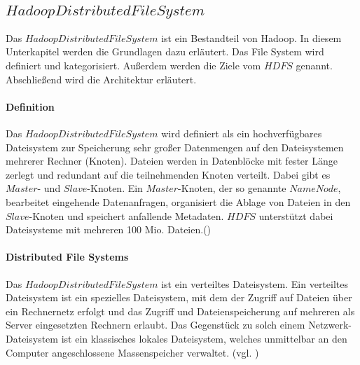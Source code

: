 \subsection{$Hadoop Distributed File System$}
Das $Hadoop Distributed File System$ ist ein Bestandteil von Hadoop. In diesem Unterkapitel werden die Grundlagen dazu erläutert. Das File System wird definiert und kategorisiert. Außerdem werden die Ziele vom $HDFS$ genannt. Abschließend wird die Architektur erläutert.

\paragraph{Definition}$\;$ \\
Das $Hadoop Distributed File System$ wird definiert als ein \glqq hochverfügbares Dateisystem zur Speicherung sehr großer Datenmengen auf den Dateisystemen mehrerer Rechner (Knoten). Dateien werden in Datenblöcke mit fester Länge zerlegt und redundant auf die teilnehmenden Knoten verteilt. Dabei gibt es $Master$- und $Slave$-Knoten. Ein $Master$-Knoten, der so genannte $NameNode$, bearbeitet eingehende Datenanfragen, organisiert die Ablage von Dateien in den $Slave$-Knoten und speichert anfallende Metadaten. $HDFS$ unterstützt dabei Dateisysteme mit mehreren 100 Mio. Dateien.\grqq (\cite{defhad})

\paragraph{Distributed File Systems}$\;$ \\
Das $Hadoop Distributed File System$ ist ein verteiltes Dateisystem. Ein verteiltes Dateisystem ist ein spezielles Dateisystem, mit dem der Zugriff auf Dateien über ein Rechnernetz erfolgt und das Zugriff und Dateienspeicherung auf mehreren als Server eingesetzten Rechnern erlaubt. Das Gegenstück zu solch einem Netzwerk-Dateisystem ist ein klassisches lokales Dateisystem, welches unmittelbar an den Computer angeschlossene Massenspeicher verwaltet. (vgl. \cite{distributfs})

